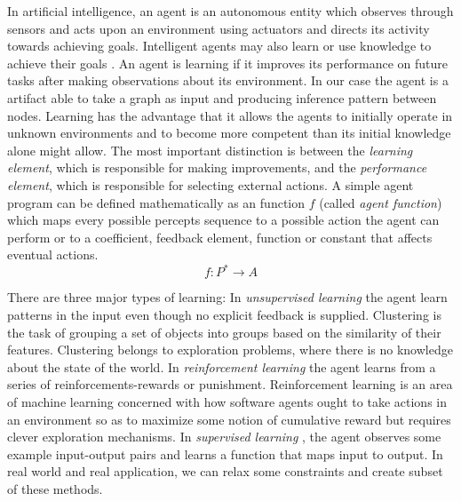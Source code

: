 \documentclass{report}
\begin{document}
In artificial intelligence, an agent is an autonomous entity which observes through sensors and acts upon an environment using actuators and directs its activity towards achieving goals. Intelligent agents may also learn or use knowledge to achieve their goals \cite{agent}. An agent is learning if it improves its performance on future tasks after making observations about its environment. In our case the agent is a  artifact able to take a graph as input and producing inference pattern between nodes.
Learning has the advantage that it allows the agents to initially operate in unknown environments and to become more competent than its initial knowledge alone might allow. The most important distinction is between the \textit{learning element}, which is responsible for making improvements, and the \textit{ performance element}, which is responsible for selecting external actions.
A simple agent program can be defined mathematically as an function $f$ (called \textit{agent function}) which maps every possible percepts sequence to a possible action the agent can perform or to a coefficient, feedback element, function or constant that affects eventual actions.
\begin{equation}
f:P^* \rightarrow A
\end{equation}

There are three major types of learning:
In\textit{ unsupervised learning }the agent learn patterns in the input even though no explicit feedback is supplied. Clustering is the task of grouping a set of objects into groups based on the similarity of their features. Clustering belongs to exploration problems, where there is no knowledge about the state of the world. In \textit{reinforcement learning} the agent learns from a series of reinforcements-rewards or punishment. Reinforcement learning is an area of machine learning concerned with how software agents ought to take actions in an environment so as to maximize some notion of cumulative reward but requires clever exploration mechanisms. In \textit{supervised learning }, the agent observes some example input-output pairs and learns a function that maps input to output. In real world and real application, we can relax some constraints and create subset of these methods.
\end{document}

